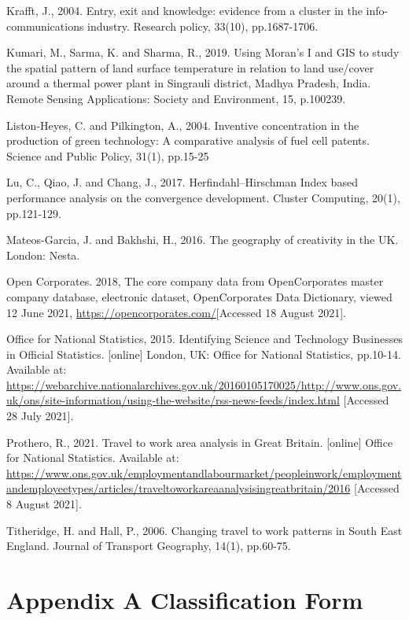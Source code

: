 \documentclass[
  12pt,
  oneside]{book}
\begin{document}
Krafft, J., 2004. Entry, exit and knowledge: evidence from a cluster in the info-communications industry. Research policy, 33(10), pp.1687-1706.

Kumari, M., Sarma, K. and Sharma, R., 2019. Using Moran's I and GIS to study the spatial pattern of land surface temperature in relation to land use/cover around a thermal power plant in Singrauli district, Madhya Pradesh, India. Remote Sensing Applications: Society and Environment, 15, p.100239.

Liston-Heyes, C. and Pilkington, A., 2004. Inventive concentration in the production of green technology: A comparative analysis of fuel cell patents. Science and Public Policy, 31(1), pp.15-25

Lu, C., Qiao, J. and Chang, J., 2017. Herfindahl--Hirschman Index based performance analysis on the convergence development. Cluster Computing, 20(1), pp.121-129.

Mateos-Garcia, J. and Bakhshi, H., 2016. The geography of creativity in the UK. London: Nesta.

Open Corporates. 2018, The core company data from OpenCorporates master company database, electronic dataset, OpenCorporates Data Dictionary, viewed 12 June 2021, \url{https://opencorporates.com/}{[}Accessed 18 August 2021{]}.

Office for National Statistics, 2015. Identifying Science and Technology Businesses in Official Statistics. {[}online{]} London, UK: Office for National Statistics, pp.10-14. Available at: \url{https://webarchive.nationalarchives.gov.uk/20160105170025/http://www.ons.gov.uk/ons/site-information/using-the-website/rss-news-feeds/index.html} {[}Accessed 28 July 2021{]}.

Prothero, R., 2021. Travel to work area analysis in Great Britain. {[}online{]} Office for National Statistics. Available at: \url{https://www.ons.gov.uk/employmentandlabourmarket/peopleinwork/employmentandemployeetypes/articles/traveltoworkareaanalysisingreatbritain/2016} {[}Accessed 8 August 2021{]}.

Titheridge, H. and Hall, P., 2006. Changing travel to work patterns in South East England. Journal of Transport Geography, 14(1), pp.60-75.

\printbibliography

\hypertarget{appendix-a-classification-form}{%
\chapter*{Appendix A Classification Form}\label{appendix-a-classification-form}}
\end{document}
